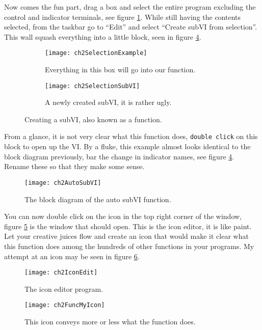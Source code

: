 Now comes the fun part, drag a box and select the entire program excluding the control and indicator terminals, see figure \ref{ch2SelectionExample}. While still having the contents selected, from the taskbar go to ``Edit'' and select ``Create subVI from selection''. This wall squash everything into a little block, seen in figure \ref{ch2AutoSubVI}.\\
\begin{figure} %
	\centering
	\begin{subfigure}[b]{0.40\textwidth}
		\centering
		\texttt{[image: ch2SelectionExample]}
		\caption{Everything in this box will go into our function.}
		\label{ch2SelectionExample}
	\end{subfigure}
	\hfil
	\begin{subfigure}[b]{0.40\textwidth}
		\centering
		\texttt{[image: ch2SelectionSubVI]}
		\caption{A newly created subVI, it is rather ugly.}
		\label{ch2SelectionSubVI}
	\end{subfigure}
	\caption{Creating a subVI, also known as a function.}
	\label{subVI}
\end{figure}

From a glance, it is not very clear what this function does, \texttt{double click} on this block to open up the VI. By a fluke, this example almost looks identical to the block diagram previously, bar the change in indicator names, see figure \ref{ch2AutoSubVI}. Rename these so that they make some sense.\\
\begin{figure}
	\centering
	\texttt{[image: ch2AutoSubVI]}
	\caption{The block diagram of the auto subVI function.}
	\label{ch2AutoSubVI}
\end{figure}

You can now double click on the icon in the top right corner of the window, figure \ref{ch2IconEdit} is the window that should open. This is the icon editor, it is like paint. Let your creative juices flow and create an icon that would make it clear what this function does among the hundreds of other functions in your programs. My attempt at an icon may be seen in figure \ref{ch2FuncMyIcon}.\\
\begin{figure}
	\centering
	\texttt{[image: ch2IconEdit]}
	\caption{The icon editor program.}
	\label{ch2IconEdit}
\end{figure}
\begin{figure}
	\centering
	\texttt{[image: ch2FuncMyIcon]}
	\caption{This icon conveys more or less what the function does.}
	\label{ch2FuncMyIcon}
\end{figure}

